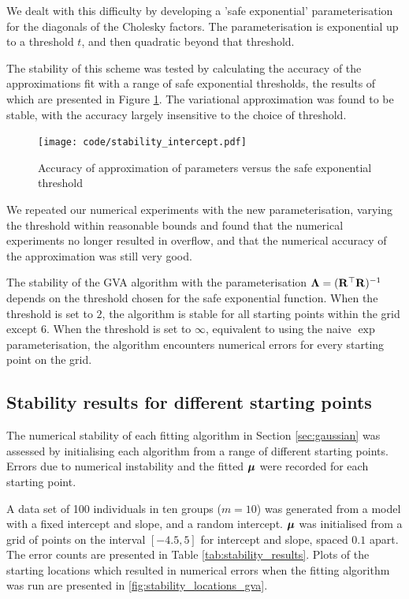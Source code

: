 \documentclass{amsart}[12pt]
\begin{document}
			We dealt with this difficulty by developing a 'safe exponential' parameterisation for the diagonals of the
			Cholesky factors. The parameterisation is exponential up to a threshold $t$, and then quadratic beyond that
			threshold.
			
			The stability of this scheme was tested by calculating the accuracy of the approximations fit with a range
			of safe exponential thresholds, the results of which are presented in Figure \ref{fig:stability_accuracy}.
			The variational approximation was found to be stable, with the accuracy largely insensitive to the choice of
			threshold.
			
			\begin{figure}
				\label{fig:stability_accuracy}
				\caption{Accuracy of approximation of parameters versus the safe exponential threshold}
				\texttt{[image: code/stability\_intercept.pdf]}
			\end{figure}
			
			We repeated our numerical experiments with the new parameterisation, varying the threshold within reasonable
			bounds and found that the numerical experiments no longer resulted in overflow, and that the numerical accuracy
			of the approximation was still very good.
			
			The stability of the GVA algorithm with the parameterisation ${\boldsymbol \Lambda} = ({\bf R}^\top {\bf R})^{-1}$ depends on the
			threshold chosen for the safe exponential function. When the threshold is set to $2$, the algorithm is stable
			for all starting points within the grid except $6$. When the threshold is set to $\infty$, equivalent to using
			the naive $\exp$ parameterisation, the algorithm encounters numerical errors for every starting point on the 
			grid.
				
			\subsection{Stability results for different starting points}
					
			The numerical stability of each fitting algorithm in Section \ref{sec:gaussian} was assessed by initialising
			each algorithm from a range of different starting points. Errors due to numerical instability and the fitted
			${\boldsymbol \mu}$ were recorded for each starting point.
					
			A data set of 100 individuals in ten groups ($m=10$) was generated from a model with a fixed intercept and
			slope, and a random intercept. ${\boldsymbol \mu}$ was initialised from a grid of points on the interval $[-4.5, 5]$ for
			intercept and slope, spaced $0.1$ apart. The error counts are presented in Table
			\ref{tab:stability_results}. Plots of the starting locations which resulted in numerical errors when the
			fitting algorithm was run are presented in \ref{fig:stability_locations_gva}.
					
\end{document}
